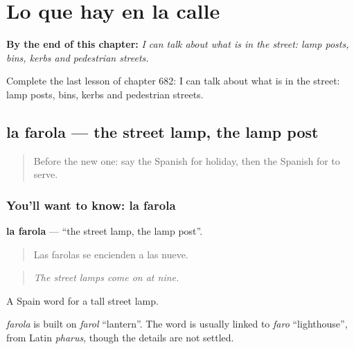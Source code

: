 
\chapter{Lo que hay en la calle}
\label{ch:es-lo-que-hay-en-la-calle}

\begin{chapteropening}
\textbf{By the end of this chapter:} \emph{I can talk about what is in the street: lamp posts, bins, kerbs and pedestrian streets.}

Complete the last lesson of chapter 682: I can talk about what is in the street: lamp posts, bins, kerbs and pedestrian streets.
\end{chapteropening}

\section[la farola]{la farola — the street lamp, the lamp post}

\label{lesson:ES-C682-farola}



\begin{quote}
Before the new one: say the Spanish for holiday, then the Spanish for to serve.
\end{quote}

\subsection*{You'll want to know: la farola}
\textbf{la farola} — \textquotedblleft{}the street lamp, the lamp post\textquotedblright{}.

\begin{quote}
Las farolas se encienden a las nueve.
\end{quote}

\begin{quote}
\emph{The street lamps come on at nine.}
\end{quote}

A Spain word for a tall street lamp.

\begin{cousinweb}
\emph{farola} is built on \emph{farol} \textquotedblleft{}lantern\textquotedblright{}. The word is usually linked to \emph{faro} \textquotedblleft{}lighthouse\textquotedblright{}, from Latin \emph{pharus}, though the details are not settled.
\end{cousinweb}

